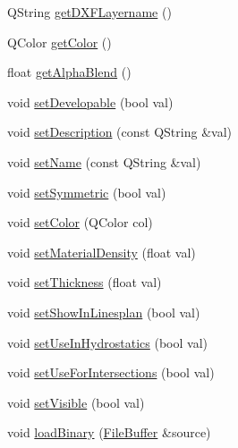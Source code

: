 \begin{DoxyCompactItemize}
\item 
Q\-String \hyperlink{classShipCADGeometry_1_1SubdivisionLayer_a52e6b9f53d989156e073d5fdc820c968}{get\-D\-X\-F\-Layername} ()
\item 
Q\-Color \hyperlink{classShipCADGeometry_1_1SubdivisionLayer_aa1a348600f3ceea5b28569c683d445a5}{get\-Color} ()
\item 
float \hyperlink{classShipCADGeometry_1_1SubdivisionLayer_a34d50c0f49578ecfe8f228bc8d52be6f}{get\-Alpha\-Blend} ()
\item 
void \hyperlink{classShipCADGeometry_1_1SubdivisionLayer_a6fdfc0d208904d821349eb7380a52411}{set\-Developable} (bool val)
\item 
void \hyperlink{classShipCADGeometry_1_1SubdivisionLayer_a3e81d07f92749d57d84688b038f60946}{set\-Description} (const Q\-String \&val)
\item 
void \hyperlink{classShipCADGeometry_1_1SubdivisionLayer_a3861c77aeb283fbea6efe943ced83f41}{set\-Name} (const Q\-String \&val)
\item 
void \hyperlink{classShipCADGeometry_1_1SubdivisionLayer_ab3c7c5072ba6cd411404651e8e0dca2f}{set\-Symmetric} (bool val)
\item 
void \hyperlink{classShipCADGeometry_1_1SubdivisionLayer_a5494031433242c810e6e307bfef33e6d}{set\-Color} (Q\-Color col)
\item 
void \hyperlink{classShipCADGeometry_1_1SubdivisionLayer_adceba3b277753b6b289745480ace9854}{set\-Material\-Density} (float val)
\item 
void \hyperlink{classShipCADGeometry_1_1SubdivisionLayer_a49eeb096434aa4b1ab37eb8f14cee896}{set\-Thickness} (float val)
\item 
void \hyperlink{classShipCADGeometry_1_1SubdivisionLayer_aa58323da0043db61eaa87672755e96d2}{set\-Show\-In\-Linesplan} (bool val)
\item 
void \hyperlink{classShipCADGeometry_1_1SubdivisionLayer_a88897eeb2b600169ca110fc4ec4aef08}{set\-Use\-In\-Hydrostatics} (bool val)
\item 
void \hyperlink{classShipCADGeometry_1_1SubdivisionLayer_aef63325b0ef8b700b96a7cd97c501936}{set\-Use\-For\-Intersections} (bool val)
\item 
void \hyperlink{classShipCADGeometry_1_1SubdivisionLayer_a979723de5c5cf0f4ecea8a5f9d0968d7}{set\-Visible} (bool val)
\item 
void \hyperlink{classShipCADGeometry_1_1SubdivisionLayer_a060357b84c0549fa7310e45680fed9bd}{load\-Binary} (\hyperlink{classShipCADGeometry_1_1FileBuffer}{File\-Buffer} \&source)

\end{DoxyCompactItemize}
